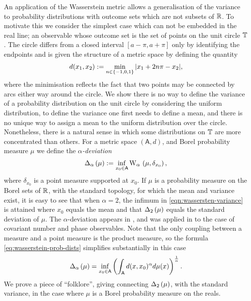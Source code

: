 An application of the Wasserstein metric allows a generalisation of the variance to probability distributions with outcome sets which are not subsets of $\mathbb{R}$. To motivate this we consider the simplest case which can not be embedded in the real line; an observable whose outcome set is the set of points on the unit circle $\mathbb{T}$. The circle differs from a closed interval $[a-\pi, a+\pi]$ only by identifying the endpoints and is given the structure of a metric space by defining the quantity
\begin{align}
  d(x_1,x_2) := \min_{n\in \{-1,0,1\}} {\left\lvert{x_1 + 2n\pi - x_2}\right\rvert},
\end{align}
where the minimisation reflects the fact that two points may be connected by arcs either way around the circle. We show there is no way to define the variance of a probability distribution on the unit circle by considering the uniform distribution, to define the variance one first needs to define a mean, and there is no unique way to assign a mean to the uniform distribution over the circle. Nonetheless, there is a natural sense in which some distributions on $\mathbb{T}$ are more concentrated than others. For a metric space $(\mathsf{A}, d)$, and Borel probability measure $\mu$ we define the \emph{$\alpha$-deviation}
\begin{align}
  \wsDev{\mu}[\alpha] \defeq \inf_{x_0\in\mathsf{A}} \ws{\mu, \delta_{x_0}}[\alpha], \label{eqn:wassersten-variance}
\end{align}
where $\delta_{x_0}$ is a point measure supported at $x_0$.  If $\mu$ is a probability measure on the Borel sets of $\mathbb{R}$, with the standard topology, for which the mean and variance exist, it is easy to see that when $\alpha=2$, the infimum in \eqref{eqn:wassersten-variance} is attained where $x_0$ equals the mean and that $\wsDev{\mu}[2]$ equals the standard deviation of $\mu$. The $\alpha$-deviation appears in \cite{blw-meas-uncertainty}, and was applied in \cite{sharp-ur-num-angle} to the case of covariant number and phase observables. Note that the only coupling between a measure and a point measure is the product measure, so the formula \eqref{eq:wasserstein-prob-dists} simplifies substantially in this case
\begin{align}
  \wsDev{\mu}[\alpha] = \inf_{x_0\in\mathsf{A}} \left(\int_{\mathsf{A}} d(x,x_0)^\alpha d\mu(x)\right)^\frac{1}{\alpha}.
\end{align}
We prove a piece of ``folklore'', giving connecting $\wsDev{\mu}[2]$, with the standard variance, in the case where $\mu$ is a Borel probability measure on the reals.
